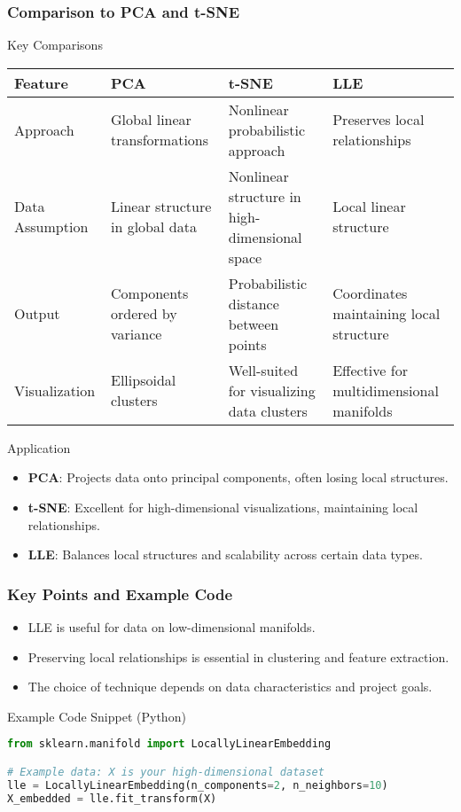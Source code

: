 \documentclass[aspectratio=169]{beamer}
\begin{document}
\begin{frame}[fragile]
    \frametitle{Comparison to PCA and t-SNE}
    \begin{block}{Key Comparisons}
        \begin{tabular}{|l|l|l|l|}
            \hline
            \textbf{Feature} & \textbf{PCA} & \textbf{t-SNE} & \textbf{LLE} \\
            \hline
            Approach & Global linear transformations & Nonlinear probabilistic approach & Preserves local relationships \\
            \hline
            Data Assumption & Linear structure in global data & Nonlinear structure in high-dimensional space & Local linear structure \\
            \hline
            Output & Components ordered by variance & Probabilistic distance between points & Coordinates maintaining local structure \\
            \hline
            Visualization & Ellipsoidal clusters & Well-suited for visualizing data clusters & Effective for multidimensional manifolds \\
            \hline
        \end{tabular}
    \end{block}
    \begin{block}{Application}
        \begin{itemize}
            \item \textbf{PCA}: Projects data onto principal components, often losing local structures.
            \item \textbf{t-SNE}: Excellent for high-dimensional visualizations, maintaining local relationships.
            \item \textbf{LLE}: Balances local structures and scalability across certain data types.
        \end{itemize}
    \end{block}
\end{frame}

\begin{frame}[fragile]
    \frametitle{Key Points and Example Code}
    \begin{itemize}
        \item LLE is useful for data on low-dimensional manifolds.
        \item Preserving local relationships is essential in clustering and feature extraction.
        \item The choice of technique depends on data characteristics and project goals.
    \end{itemize}
    \begin{block}{Example Code Snippet (Python)}
    \begin{lstlisting}[language=Python]
from sklearn.manifold import LocallyLinearEmbedding

# Example data: X is your high-dimensional dataset
lle = LocallyLinearEmbedding(n_components=2, n_neighbors=10)
X_embedded = lle.fit_transform(X)
    \end{lstlisting}
    \end{block}
\end{frame}
\end{document}
